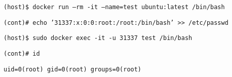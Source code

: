 \texttt{\textlatin{(host)\$ docker run --rm -it --name=test ubuntu:latest /bin/bash}}

\texttt{\textlatin{(cont)\# echo '31337:x:0:0:root:/root:/bin/bash' >> /etc/passwd}}

\texttt{\textlatin{(host)\$ sudo docker exec -it -u 31337 test /bin/bash}}

\texttt{\textlatin{(cont)\# id}}

\texttt{\textlatin{uid=0(root) gid=0(root) groups=0(root)}} \\
